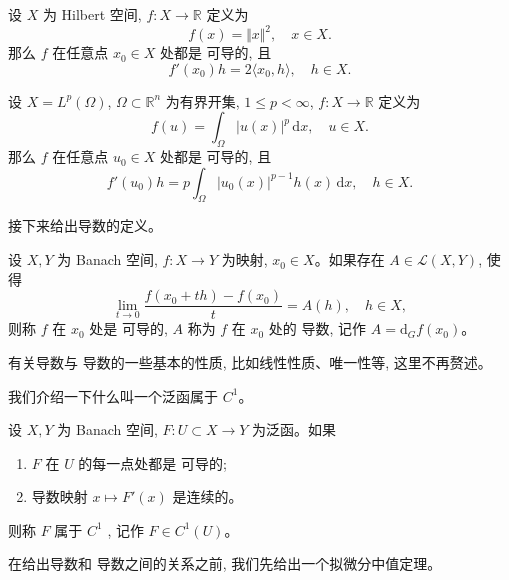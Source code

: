 \documentclass[11pt]{ctexart}
\begin{document}
\begin{example}
  设 $X$ 为 Hilbert 空间, $f: X \to \mathbb{R}$ 定义为
  \begin{equation*}
    f(x) = \Vert x\Vert^{2}, \quad x \in X.
  \end{equation*}
  那么 $f$ 在任意点 $x_{0} \in X$ 处都是 \Frechet 可导的, 且
  \begin{equation*}
    f'(x_{0})h = 2\langle x_{0}, h\rangle, \quad h \in X.
  \end{equation*}
\end{example}
\begin{example}
  设 $X = L^{p}(\Omega)$, $\Omega \subset \mathbb{R}^n$ 为有界开集, $1 \le p < \infty$, $f: X \to \mathbb{R}$ 定义为
  \begin{equation*}
    f(u) = \int_{\Omega} |u(x)|^{p} \,\mathrm{d}x, \quad u \in X.
  \end{equation*}
  那么 $f$ 在任意点 $u_{0} \in X$ 处都是 \Frechet 可导的, 且
  \begin{equation*}
    f'(u_{0})h = p\int_{\Omega} |u_{0}(x)|^{p-1}  h(x) \,\mathrm{d}x, \quad h \in X.
  \end{equation*}
\end{example}
接下来给出\Gateaux 导数的定义。
\begin{definition}
  设 $X, Y$ 为 Banach 空间, $f: X \to Y$ 为映射, $x_{0} \in X$。如果存在 $A \in \mathscr{L}(X,Y)$, 使得
  \begin{equation}
    \lim_{t \to 0} \frac{f(x_{0} + th) - f(x_{0})}{t} = A(h), \quad h \in X,
  \end{equation}
  则称 $f$ 在 $x_{0}$ 处是 \Gateaux 可导的, $A$ 称为 $f$ 在 $x_{0}$ 处的 \Gateaux 导数, 记作 $A = \mathrm{d}_{G}f(x_{0})$。
\end{definition}
\begin{remark}
  有关\Frechet 导数与 \Gateaux 导数的一些基本的性质, 比如线性性质、唯一性等, 这里不再赘述。
\end{remark}
我们介绍一下什么叫一个泛函属于 $C^{1}$。
\begin{definition}
  设 $X, Y$ 为 Banach 空间, $F: U\subset X \to Y$ 为泛函。如果
  \begin{enumerate}
    \item $F$ 在 $U$ 的每一点处都是 \Frechet 可导的;
    \item 导数映射 $x \mapsto F'(x)$ 是连续的。
  \end{enumerate}
  则称 $F$ 属于 $C^{1}$ , 记作 $F \in C^{1}(U)$。
\end{definition}
在给出\Gateaux 导数和 \Frechet 导数之间的关系之前, 我们先给出一个拟微分中值定理。
\end{document}
